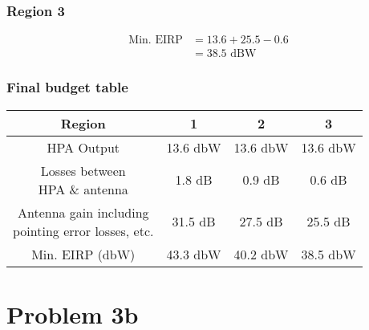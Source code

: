 \documentclass[titlepage]{article}
\begin{document}
\subsubsection*{Region 3}
\begin{align}
    \text{Min. EIRP} & = 13.6 + 25.5 - 0.6 \nonumber \\
                     & = 38.5 \text{ dBW} \nonumber
\end{align}
\subsubsection{Final budget table}
\begin{center}
    \begin{tabular}{||c | c | c | c||}
        \hline
        Region          & 1        & 2        & 3        \\[0.5ex]
        \hline\hline
        HPA Output      & 13.6 dbW & 13.6 dbW & 13.6 dbW \\[0.5ex]
        \hline
        \makecell{Losses between                         \\ HPA \& antenna} & 1.8 dB & 0.9 dB & 0.6 dB \\[0.5ex]
        \hline
        \makecell{Antenna gain including                 \\ pointing error losses, etc.} & 31.5 dB & 27.5 dB & 25.5 dB \\[0.5ex]
        \hline
        Min. EIRP (dbW) & 43.3 dbW & 40.2 dbW & 38.5 dbW \\[0.5ex]
        \hline
    \end{tabular}
\end{center}

\newpage

\section {Problem 3b}
\end{document}
